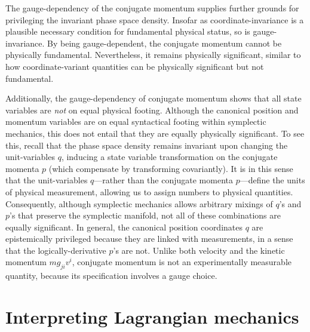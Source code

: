 \documentclass[12pt, english, twoside]{article} %
\begin{document}
The gauge-dependency of the conjugate momentum supplies further grounds for privileging the invariant phase space density. Insofar as coordinate-invariance is a plausible necessary condition for fundamental physical status, so is gauge-invariance. By being gauge-dependent, the conjugate momentum cannot be physically fundamental. Nevertheless, it remains physically significant, similar to how coordinate-variant quantities can be physically significant but not fundamental.

Additionally, the gauge-dependency of conjugate momentum shows that all state variables are \textit{not} on equal physical footing. Although the canonical position and momentum variables are on equal syntactical footing within symplectic mechanics, this does not entail that they are equally physically significant. To see this, recall that the phase space density remains invariant upon changing the unit-variables $q$, inducing a state variable transformation on the conjugate momenta $p$ (which compensate by transforming covariantly). It is in this sense that the unit-variables $q$---rather than the conjugate momenta $p$---define the units of physical measurement, allowing us to assign numbers to physical quantities. Consequently, although symplectic mechanics allows arbitrary mixings of $q$'s and $p$'s that preserve the symplectic manifold, not all of these combinations are equally significant. In general, the canonical position coordinates $q$ are epistemically privileged because they are linked with measurements, in a sense that the logically-derivative $p$'s are not. Unlike both velocity and the kinetic momentum $m g_{ji} v^i$, conjugate momentum is not an experimentally measurable quantity, because its specification involves a gauge choice.



\section{Interpreting Lagrangian mechanics}
\label{Lagrangian}
\end{document}
